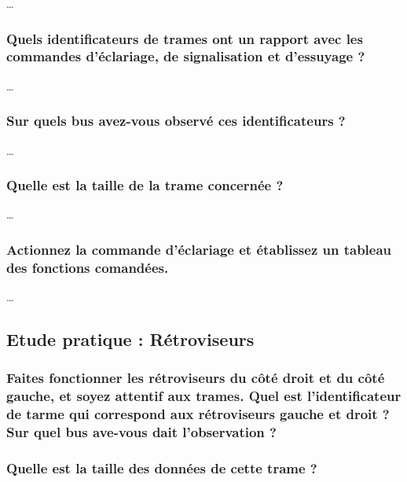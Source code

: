 \documentclass{rapportECC}
\begin{document}
\dots

\subsubsection*{Quels identificateurs de trames ont un rapport avec les commandes d'éclariage, de signalisation et d'essuyage ?}

\dots

\subsubsection*{Sur quels bus avez-vous observé ces identificateurs ?}

\dots

\subsubsection*{Quelle est la taille de la trame concernée ?}

\dots

\subsubsection*{Actionnez la commande d'éclariage et établissez un tableau des fonctions comandées.}

\dots


\subsection{Etude pratique : Rétroviseurs}

\subsubsection*{Faites fonctionner les rétroviseurs du côté droit et du côté gauche, et soyez attentif aux trames. Quel est l'identificateur de tarme qui correspond aux rétroviseurs gauche et droit ?  Sur quel bus ave-vous dait l'observation ?}

\subsubsection*{Quelle est la taille des données de cette trame ?}
\end{document}
